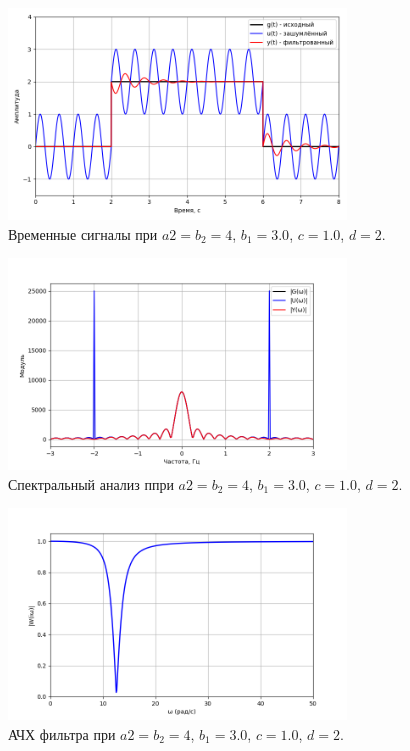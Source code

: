 \documentclass[a4paper]{article}
\begin{document}
\begin{figure}[H]
  \centering
  \includegraphics[width=0.8\textwidth]{src/task_1_2/6. time_157_3_1.0.png}
  \caption{Временные сигналы при $a2 = b_2 = 4$, $b_1=3.0$, $c=1.0$, $d=2$.}
\end{figure}
\begin{figure}[H]
  \centering
  \includegraphics[width=0.8\textwidth]{src/task_1_2/6. spec_157_3_1.0.png}
  \caption{Спектральный анализ ппри $a2 = b_2 = 4$, $b_1=3.0$, $c=1.0$, $d=2$.}
\end{figure}
\begin{figure}[H]
  \centering
  \includegraphics[width=0.8\textwidth]{src/task_1_2/6. ach_157_3_1.0.png}
  \caption{АЧХ фильтра при $a2 = b_2 = 4$, $b_1=3.0$, $c=1.0$, $d=2$.}
\end{figure}
\end{document}
